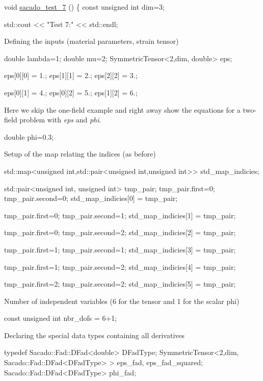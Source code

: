 \begin{DoxyCode}
\textcolor{keywordtype}{void} \hyperlink{example__code__to__be__documented_8cc_a0b694459e5e15c1578d97e637faba8de}{sacado\_test\_7} ()
\{
    \textcolor{keyword}{const} \textcolor{keywordtype}{unsigned} \textcolor{keywordtype}{int} dim=3;
 
    std::cout << \textcolor{stringliteral}{"Test 7:"} << std::endl;
\end{DoxyCode}
 Defining the inputs (material parameters, strain tensor) 
\begin{DoxyCode}
\textcolor{keywordtype}{double} lambda=1;
\textcolor{keywordtype}{double} mu=2;
SymmetricTensor<2,dim, double> eps;

eps[0][0] = 1.;
eps[1][1] = 2.;
eps[2][2] = 3.;

eps[0][1] = 4.;
eps[0][2] = 5.;
eps[1][2] = 6.;
\end{DoxyCode}
 Here we skip the one-\/field example and right away show the equations for a two-\/field problem with {\itshape eps} and {\itshape phi}. 
\begin{DoxyCode}
\textcolor{keywordtype}{double} phi=0.3;
\end{DoxyCode}
 Setup of the map relating the indices (as before) 
\begin{DoxyCode}
std::map<unsigned int,std::pair<unsigned int,unsigned int>> std\_map\_indicies;

std::pair<unsigned int, unsigned int> tmp\_pair;
tmp\_pair.first=0; tmp\_pair.second=0;
std\_map\_indicies[0] = tmp\_pair;

tmp\_pair.first=0; tmp\_pair.second=1;
std\_map\_indicies[1] = tmp\_pair;

tmp\_pair.first=0; tmp\_pair.second=2;
std\_map\_indicies[2] = tmp\_pair;

tmp\_pair.first=1; tmp\_pair.second=1;
std\_map\_indicies[3] = tmp\_pair;

tmp\_pair.first=1; tmp\_pair.second=2;
std\_map\_indicies[4] = tmp\_pair;

tmp\_pair.first=2; tmp\_pair.second=2;
std\_map\_indicies[5] = tmp\_pair;
\end{DoxyCode}
 Number of independent variables (6 for the tensor and 1 for the scalar phi) 
\begin{DoxyCode}
\textcolor{keyword}{const} \textcolor{keywordtype}{unsigned} \textcolor{keywordtype}{int} nbr\_dofs = 6+1;
\end{DoxyCode}
 Declaring the special data types containing all derivatives 
\begin{DoxyCode}
\textcolor{keyword}{typedef} Sacado::Fad::DFad<double> DFadType;
SymmetricTensor<2,dim, Sacado::Fad::DFad<DFadType> > eps\_fad, eps\_fad\_squared;
Sacado::Fad::DFad<DFadType> phi\_fad;
\end{DoxyCode}
